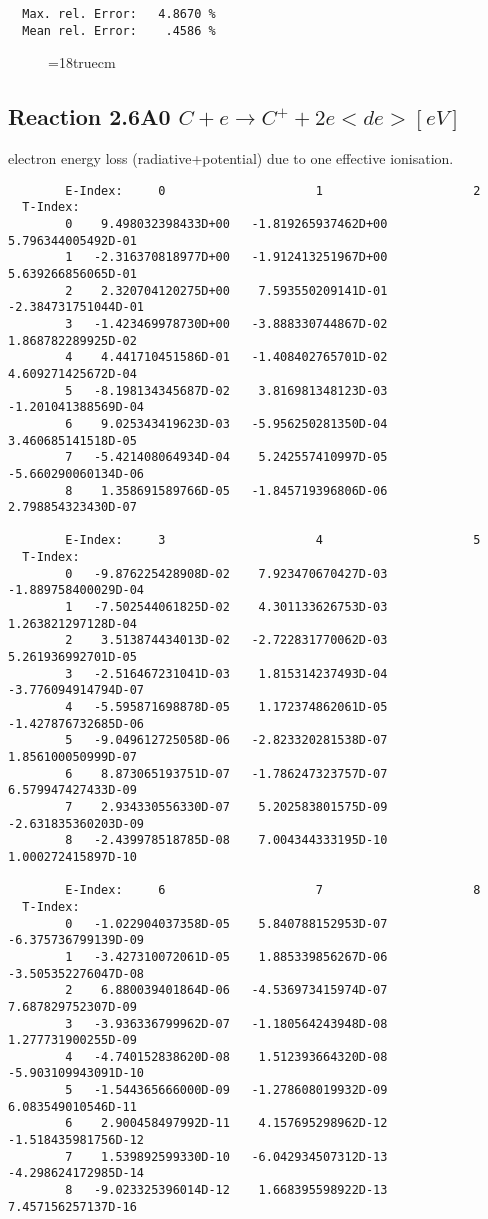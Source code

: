 \begin{verbatim}
  Max. rel. Error:   4.8670 %
  Mean rel. Error:    .4586 %

\end{verbatim}
\begin{figure} \label{2.3.9aec}
\epsfxsize=18truecm
\end{figure}
\newpage

\subsection{
  Reaction 2.6A0 $C  + e \rightarrow C^+   + 2e  <de> [eV] $
}

  electron energy loss (radiative+potential) due to one effective ionisation.

\begin{verbatim}
        E-Index:     0                     1                     2
  T-Index:
        0    9.498032398433D+00   -1.819265937462D+00    5.796344005492D-01
        1   -2.316370818977D+00   -1.912413251967D+00    5.639266856065D-01
        2    2.320704120275D+00    7.593550209141D-01   -2.384731751044D-01
        3   -1.423469978730D+00   -3.888330744867D-02    1.868782289925D-02
        4    4.441710451586D-01   -1.408402765701D-02    4.609271425672D-04
        5   -8.198134345687D-02    3.816981348123D-03   -1.201041388569D-04
        6    9.025343419623D-03   -5.956250281350D-04    3.460685141518D-05
        7   -5.421408064934D-04    5.242557410997D-05   -5.660290060134D-06
        8    1.358691589766D-05   -1.845719396806D-06    2.798854323430D-07

        E-Index:     3                     4                     5
  T-Index:
        0   -9.876225428908D-02    7.923470670427D-03   -1.889758400029D-04
        1   -7.502544061825D-02    4.301133626753D-03    1.263821297128D-04
        2    3.513874434013D-02   -2.722831770062D-03    5.261936992701D-05
        3   -2.516467231041D-03    1.815314237493D-04   -3.776094914794D-07
        4   -5.595871698878D-05    1.172374862061D-05   -1.427876732685D-06
        5   -9.049612725058D-06   -2.823320281538D-07    1.856100050999D-07
        6    8.873065193751D-07   -1.786247323757D-07    6.579947427433D-09
        7    2.934330556330D-07    5.202583801575D-09   -2.631835360203D-09
        8   -2.439978518785D-08    7.004344333195D-10    1.000272415897D-10

        E-Index:     6                     7                     8
  T-Index:
        0   -1.022904037358D-05    5.840788152953D-07   -6.375736799139D-09
        1   -3.427310072061D-05    1.885339856267D-06   -3.505352276047D-08
        2    6.880039401864D-06   -4.536973415974D-07    7.687829752307D-09
        3   -3.936336799962D-07   -1.180564243948D-08    1.277731900255D-09
        4   -4.740152838620D-08    1.512393664320D-08   -5.903109943091D-10
        5   -1.544365666000D-09   -1.278608019932D-09    6.083549010546D-11
        6    2.900458497992D-11    4.157695298962D-12   -1.518435981756D-12
        7    1.539892599330D-10   -6.042934507312D-13   -4.298624172985D-14
        8   -9.023325396014D-12    1.668395598922D-13    7.457156257137D-16


\end{verbatim}
